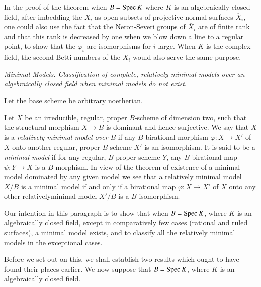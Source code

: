 \begin{remark*}%
  In the proof of the theorem when $B =  \operatorname{Spec}  K$ where $K$ is an
  algebraically closed field, after imbedding the $X_i$ as open
  subsets of projective normal surfaces $\overline{X}_i$, one could
  also use the fact that the Neron-Severi groups of $\overline{X}_i$
  are of finite rank and that this rank is decreased by one when we
  blow down a line to a regular point, to show that the $\varphi_i$
  are isomorphisms for $i$ large. When $K$ is the complex field, the
  second Betti-numbers of the $\overline{X}_i$ would also serve the
  same purpose. 
\end{remark*}

\noindent
\textit{ Minimal Models. Classification of complete, relatively
  minimal models over an algebraically closed field when minimal
  models do not exist}. 

Let the base scheme be arbitrary noetherian.

Let $X$ be an irreducible, regular, proper $B$-scheme of  dimension
two, such that the structural morphism $X \to B$ is dominant and hence
surjective. We say that $X$ is a \textit{ relatively minimal model
  over $B$ } if any $B$-birational morphism $\varphi : X \to X'$ of
$X$ onto another regular, proper $B$-scheme $X'$ is an isomorphism. It
is said to be a \textit {minimal model} if for any regular, $B$-proper
scheme $Y$, any $B$-birational map $\psi : Y \to X$ is a
$B$-morphism. In view of the  theorem of existence of a minimal model
dominated by any given model we see that a relatively minimal model
$X/B$ is a minimal model if and only if a birational map $\varphi : X
\to X'$ of $ X $ onto any other relatively\pageoriginale minimal model
$X'/B$ is a $B$-isomorphism.  

Our intention in this paragraph is to show that when $B =\operatorname{Spec}  K$,
where $K$ is an algebraically closed field, except in comparatively
few cases (rational and ruled surfaces), a minimal model exists, and
to classify all the relatively minimal models in the exceptional
cases. 

Before we set out on this, we shall establish two results which ought
to have found their places earlier. We now suppose that $B =  \operatorname{Spec}
K$, where $K$ is an algebraically closed field. 

